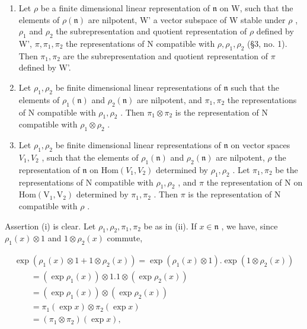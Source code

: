 \begin{enumerate}
\def\labelenumi{(\roman{enumi})}
\item
  Let \(\rho\) be a finite dimensional linear representation of \(\mathfrak{n}\) on W, such that the elements of \(\rho(\mathfrak{n})\) are nilpotent, W' a vector subspace of W stable under \(\rho\) , \(\rho_1\) and \(\rho_2\) the subrepresentation and quotient representation of \(\rho\) defined by W', \(\pi, \pi_1, \pi_2\) the representations of N compatible with \(\rho, \rho_1, \rho_2\) (§3, no. 1). Then \(\pi_1, \pi_2\) are the subrepresentation and quotient representation of \(\pi\) defined by W'.
\item
  Let \(\rho_1, \rho_2\) be finite dimensional linear representations of \(\mathfrak{n}\) such that the elements of \(\rho_1(\mathfrak{n})\) and \(\rho_2(\mathfrak{n})\) are nilpotent, and \(\pi_1, \pi_2\) the representations of N compatible with \(\rho_1, \rho_2\) . Then \(\pi_1 \otimes \pi_2\) is the representation of N compatible with \(\rho_1 \otimes \rho_2\) .
\item
  Let \(\rho_{1},\rho_{2}\) be finite dimensional linear representations of \(\mathfrak{n}\) on vector spaces \(V_{1},V_{2}\) , such that the elements of \(\rho_1(\mathfrak{n})\) and \(\rho_{2}(\mathfrak{n})\) are nilpotent, \(\rho\) the representation of \(\mathfrak{n}\) on \(\mathrm{Hom}(V_1,V_2)\) determined by \(\rho_{1},\rho_{2}\) . Let \(\pi_1,\pi_2\) be the representations of N compatible with \(\rho_{1},\rho_{2}\) , and \(\pi\) the representation of N on \(\mathrm{Hom}(\mathrm{V}_1,\mathrm{V}_2)\) determined by \(\pi_1,\pi_2\) . Then \(\pi\) is the representation of N compatible with \(\rho\) .
\end{enumerate}

Assertion (i) is clear. Let \(\rho_1, \rho_2, \pi_1, \pi_2\) be as in (ii). If \(x \in \mathfrak{n}\) , we have, since \(\rho_1(x) \otimes 1\) and \(1 \otimes \rho_2(x)\) commute,

\[
\begin{array}{l} \exp (\rho_ {1} (x) \otimes 1 + 1 \otimes \rho_ {2} (x)) = \exp (\rho_ {1} (x) \otimes 1). \exp (1 \otimes \rho_ {2} (x)) \\ \qquad = (\exp \rho_ {1} (x)) \otimes 1. 1 \otimes (\exp \rho_ {2} (x)) \\ \qquad = (\exp \rho_ {1} (x)) \otimes (\exp \rho_ {2} (x)) \\ \qquad = \pi_ {1} (\exp x) \otimes \pi_ {2} (\exp x) \\ \qquad = (\pi_ {1} \otimes \pi_ {2}) (\exp x), \end{array}
\]

